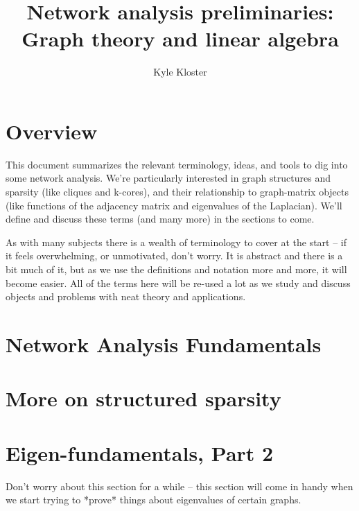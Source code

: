 \documentclass[a4paper,10pt]{article}
\title{Network analysis preliminaries:\\
Graph theory and linear algebra}
\author{Kyle Kloster}
\begin{document}
\maketitle



\section{Overview}
This document summarizes the relevant terminology, ideas, and tools to dig into some network analysis. We're particularly interested in graph structures and sparsity (like cliques and k-cores), and their relationship to graph-matrix objects (like functions of the adjacency matrix and eigenvalues of the Laplacian). We'll define and discuss these terms (and many more) in the sections to come.

As with many subjects there is a wealth of terminology to cover at the start -- if it feels overwhelming, or unmotivated, don't worry. It is abstract and there is a bit much of it, but as we use the definitions and notation more and more, it will become easier. All of the terms here will be re-used a lot as we study and discuss objects and problems with neat theory and applications.



\section{Network Analysis Fundamentals}\label{sec:fundamentals}




%




\section{More on structured sparsity}\label{sec:structured-sparsity}





\section{Eigen-fundamentals, Part 2}\label{sec:fundamentals:eigen2}

Don't worry about this section for a while -- this section will come in handy when we start trying to *prove* things about eigenvalues of certain graphs.








{\footnotesize


}
\end{document}
